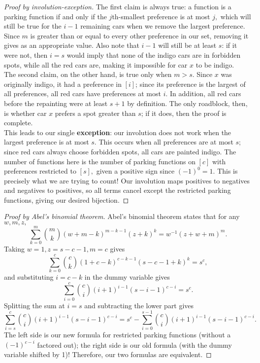\begin{proof}[Proof by involution-exception]
    The first claim is always true: a function is a parking function if and only if the $j$th-smallest preference is at most $j,$ which will still be true for the $i-1$ remaining cars when we remove the largest preference. Since $m$ is greater than or equal to every other preference in our set, removing it gives as an appropriate value. Also note that $i-1$ will still be at least $s$: if it were not, then $i=s$ would imply that none of the indigo cars are in forbidden spots, while all the red cars are, making it impossible for car $x$ to be indigo.\\

    The second claim, on the other hand, is true only when $m>s.$ Since $x$ was originally indigo, it had a preference in $[i]$; since its preference is the largest of all preferences, all red cars have preferences at most $i.$ In addition, all red cars before the repainting were at least $s+1$ by definition. The only roadblock, then, is whether car $x$ prefers a spot greater than $s$; if it does, then the proof is complete.\\

    This leads to our single \textbf{exception}: our involution does not work when the largest preference is at most $s.$ This occurs when all preferences are at most $s$; since red cars always choose forbidden spots, all cars are painted indigo. The number of functions here is the number of parking functions on $[c]$ with preferences restricted to $[s],$ given a positive sign since $(-1)^0=1.$ This is precisely what we are trying to count! Our involution maps positives to negatives and negatives to positives, so all terms cancel except the restricted parking functions, giving our desired bijection.
\end{proof}

\begin{proof}[Proof by Abel's binomial theorem]

Abel's binomial theorem states that for any $w,m,z,$ $$\sum_{k=0}^m \binom{m}{k}(w+m-k)^{m-k-1}(z+k)^k=w^{-1}(z+w+m)^m.$$ Taking $w=1,z=s-c-1,m=c$ gives $$\sum_{k=0}^c \binom{c}{k}(1+c-k)^{c-k-1}(s-c-1+k)^k=s^c,$$ and substituting $i=c-k$ in the dummy variable gives $$\sum_{i=0}^c \binom{c}{i}(i+1)^{i-1}(s-i-1)^{c-i}=s^c.$$ Splitting the sum at $i=s$ and subtracting the lower part gives $$\sum_{i=s}^c \binom{c}{i}(i+1)^{i-1}(s-i-1)^{c-i}=s^c-\sum_{i=0}^{s-1} \binom{c}{i}(i+1)^{i-1}(s-i-1)^{c-i}.$$ The left side is our new formula for restricted parking functions (without a $(-1)^{c-i}$ factored out); the right side is our old formula (with the dummy variable shifted by 1)! Therefore, our two formulas are equivalent.
\end{proof}

